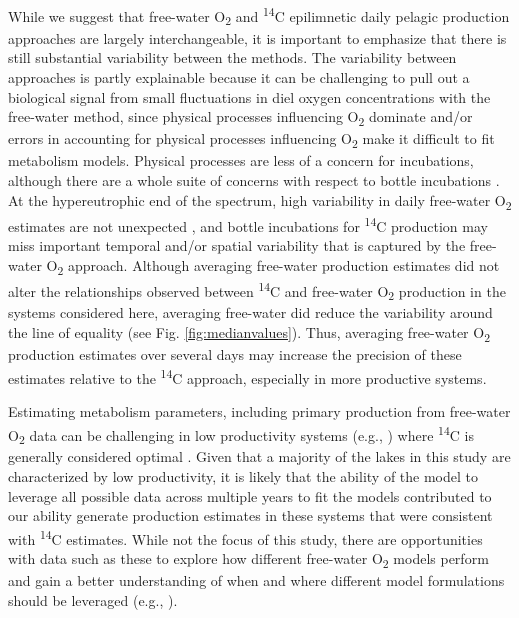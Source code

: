 \documentclass[12pt, oneside]{article}
\begin{document}
While we suggest that free-water O\textsubscript{2} and \textsuperscript{14}C epilimnetic daily pelagic production approaches are largely interchangeable, it is important to emphasize that there is still substantial variability between the methods. The variability between approaches is partly explainable because it can be challenging to pull out a biological signal from small fluctuations in diel oxygen concentrations with the free-water method, since physical processes influencing O\textsubscript{2} dominate and/or errors in accounting for physical processes influencing O\textsubscript{2} make it difficult to fit metabolism models. Physical processes are less of a concern for incubations, although there are a whole suite of concerns with respect to bottle incubations \citep{hall_measuring_2007}. At the hypereutrophic end of the spectrum, high variability in daily free-water O\textsubscript{2} estimates are not unexpected \citep{Williamson_Vanni_Renwick_2020}, and bottle incubations for \textsuperscript{14}C production may miss important temporal and/or spatial variability that is captured by the free-water O\textsubscript{2} approach. Although averaging free-water production estimates did not alter the relationships observed between \textsuperscript{14}C and free-water O\textsubscript{2} production in the systems considered here, averaging free-water did reduce the variability around the line of equality (see Fig. \ref{fig:medianvalues}). Thus, averaging free-water O\textsubscript{2} production estimates over several days may increase the precision of these estimates relative to the \textsuperscript{14}C approach, especially in more productive systems.

Estimating metabolism parameters, including primary production from free-water O\textsubscript{2} data can be challenging in low productivity systems (e.g., \citealt{Richardson_Carey_Bruesewitz_Weathers_2017, McNair_Sesselmann_Kendall_Gereaux_Weinke_Biddanda_2015, Honti_Istvanovics_2019}) where \textsuperscript{14}C is generally considered optimal \citep{hall_measuring_2007}. Given that a majority of the lakes in this study are characterized by low productivity, it is likely that the ability of the \citep{phillips_timevarying_2020} model to leverage all possible data across multiple years to fit the models contributed to our ability generate production estimates in these systems that were consistent with \textsuperscript{14}C estimates. While not the focus of this study, there are opportunities with data such as these to explore how different free-water O\textsubscript{2} models perform and gain a better understanding of when and where different model formulations should be leveraged (e.g., \citealt{Honti_Istvanovics_Staehr_Brighenti_Zhu_Zhu_2016,staehr_global_2016, McNair_Sesselmann_Kendall_Gereaux_Weinke_Biddanda_2015}).
\end{document}
